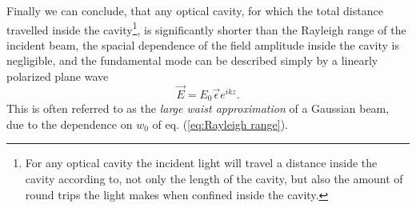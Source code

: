 Finally we can conclude, that any optical cavity, for which the total distance travelled inside the cavity\footnote{For any optical cavity the incident light will travel a distance inside the cavity according to, not only the length of the cavity, but also the amount of round trips the light makes when confined inside the cavity.}, is significantly shorter than the Rayleigh range of the incident beam, the spacial dependence of the field amplitude inside the cavity is negligible, and the fundamental mode can be described simply by a linearly polarized plane wave
\begin{equation}
    \vec{E} = E_0 \vec{\epsilon} e^{ikz}.
\end{equation}
This is often referred to as the \emph{large waist approximation} of a Gaussian beam, due to the dependence on $w_0$ of eq. (\ref{eq:Rayleigh range}).